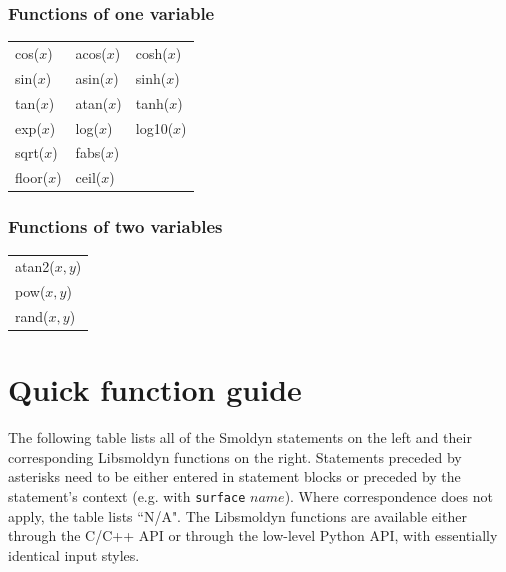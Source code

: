 \documentclass {scrbook}
\newcommand {\ttt} {\texttt}
\begin{document}
\subsection*{Functions of one variable}

\begin{longtable}[c]{lll}
cos($x$) & acos($x$) & cosh($x$)\\
sin($x$) & asin($x$) & sinh($x$)\\
tan($x$) & atan($x$) & tanh($x$)\\
exp($x$) & log($x$) & log10($x$)\\
sqrt($x$) & fabs($x$)\\
floor($x$) & ceil($x$)
\end{longtable}

\subsection*{Functions of two variables}

\begin{longtable}[c]{l}
atan2($x,y$)\\
pow($x,y$)\\
rand($x,y$)
\end{longtable}


\chapter{Quick function guide}

The following table lists all of the Smoldyn statements on the left and their corresponding Libsmoldyn functions on the right. Statements preceded by asterisks need to be either entered in statement blocks or preceded by the statement's context (e.g. with \ttt{surface} $name$). Where correspondence does not apply, the table lists ``N/A". The Libsmoldyn functions are available either through the C/C++ API or through the low-level Python API, with essentially identical input styles.
\end{document}
